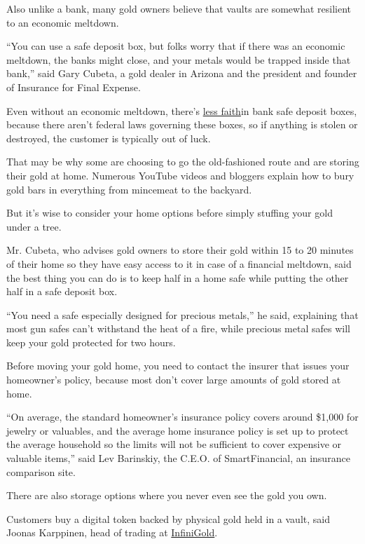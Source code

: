 Also unlike a bank, many gold owners believe that vaults are somewhat
resilient to an economic meltdown.

``You can use a safe deposit box, but folks worry that if there was an
economic meltdown, the banks might close, and your metals would be
trapped inside that bank,'' said Gary Cubeta, a gold dealer in Arizona
and the president and founder of Insurance for Final Expense.

Even without an economic meltdown, there's
\href{https://www.nytimes.com/2019/07/19/business/safe-deposit-box-theft.html}{less
faith}in bank safe deposit boxes, because there aren't federal laws
governing these boxes, so if anything is stolen or destroyed, the
customer is typically out of luck.

That may be why some are choosing to go the old-fashioned route and are
storing their gold at home. Numerous YouTube videos and bloggers explain
how to bury gold bars in everything from mincemeat to the backyard.

But it's wise to consider your home options before simply stuffing your
gold under a tree.

Mr. Cubeta, who advises gold owners to store their gold within 15 to 20
minutes of their home so they have easy access to it in case of a
financial meltdown, said the best thing you can do is to keep half in a
home safe while putting the other half in a safe deposit box.

``You need a safe especially designed for precious metals,'' he said,
explaining that most gun safes can't withstand the heat of a fire, while
precious metal safes will keep your gold protected for two hours.

Before moving your gold home, you need to contact the insurer that
issues your homeowner's policy, because most don't cover large amounts
of gold stored at home.

``On average, the standard homeowner's insurance policy covers around
\$1,000 for jewelry or valuables, and the average home insurance policy
is set up to protect the average household so the limits will not be
sufficient to cover expensive or valuable items,'' said Lev Barinskiy,
the C.E.O. of SmartFinancial, an insurance comparison site.

There are also storage options where you never even see the gold you
own.

Customers buy a digital token backed by physical gold held in a vault,
said Joonas Karppinen, head of trading at
\href{https://www.infinigold.com/}{InfiniGold}.

